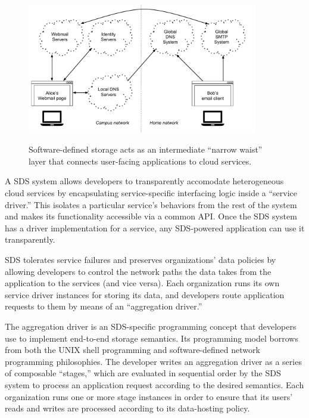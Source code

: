 \begin{figure}[h]
   \caption{Software-defined storage acts as an intermediate ``narrow waist''
   layer that connects user-facing applications to cloud services.}
   \centering
   \includegraphics[width=0.9\textwidth,page=28]{figures/dissertation-figures}
   \label{fig:chap1-sds-overview}
\end{figure}

A SDS system allows developers
to transparently accomodate heterogeneous cloud services by encapsulating
service-specific interfacing logic inside a ``service driver.''  This
isolates a particular service's behaviors from the rest of the
system and makes its functionality accessible via a common API.  Once the SDS system has a
driver implementation for a service, any SDS-powered application can use it
transparently.

SDS tolerates service failures and preserves organizations' data policies by
allowing developers to control the network paths the data takes from the application to
the services (and vice versa).  Each organization runs its own
service driver instances for storing its data, and developers
route application requests to them by means of an ``aggregation driver.''

The aggregation driver is an SDS-specific programming concept that developers
use to implement end-to-end storage semantics.  Its
programming model borrows from both the UNIX shell programming and software-defined
network programming philosophies.  The developer writes an aggregation driver as a
series of composable ``stages,'' which are evaluated in sequential order by the
SDS system to process an application request according to the desired semantics.
Each organization runs one or more stage instances in order to ensure
that its users' reads and writes are processed according to its data-hosting
policy.

